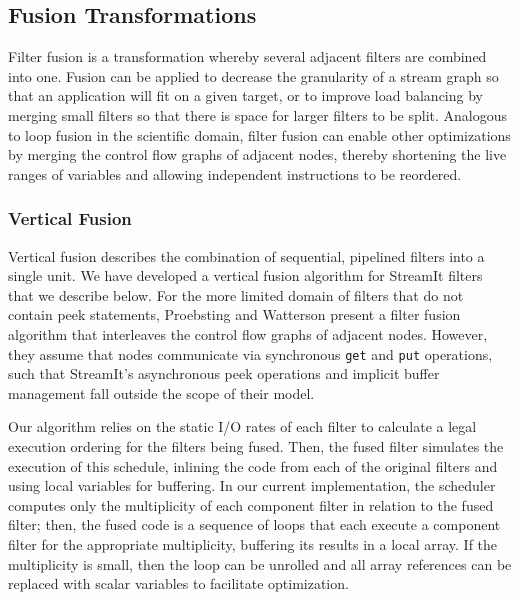 \subsection{Fusion Transformations}

Filter fusion is a transformation whereby several adjacent filters are
combined into one.  Fusion can be applied to decrease the granularity
of a stream graph so that an application will fit on a given target,
or to improve load balancing by merging small filters so that there is
space for larger filters to be split.  Analogous to loop fusion in the
scientific domain, filter fusion can enable other optimizations by
merging the control flow graphs of adjacent nodes, thereby shortening
the live ranges of variables and allowing independent instructions to
be reordered.

\subsubsection{Vertical Fusion}

Vertical fusion describes the combination of sequential, pipelined
filters into a single unit.  We have developed a vertical fusion
algorithm for StreamIt filters that we describe below.  For the more
limited domain of filters that do not contain peek statements,
Proebsting and Watterson \cite{pro96} present a filter fusion
algorithm that interleaves the control flow graphs of adjacent nodes.
However, they assume that nodes communicate via synchronous {\tt get}
and {\tt put} operations, such that StreamIt's asynchronous peek
operations and implicit buffer management fall outside the scope of
their model.

Our algorithm relies on the static I/O rates of each filter to
calculate a legal execution ordering for the filters being fused.
Then, the fused filter simulates the execution of this schedule,
inlining the code from each of the original filters and using local
variables for buffering.  In our current implementation, the scheduler
computes only the multiplicity of each component filter in relation to
the fused filter; then, the fused code is a sequence of loops that
each execute a component filter for the appropriate multiplicity,
buffering its results in a local array.  If the multiplicity is small,
then the loop can be unrolled and all array references can be replaced
with scalar variables to facilitate optimization.

